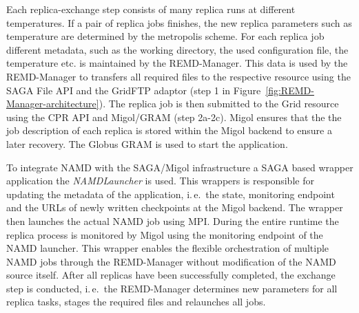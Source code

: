 \documentclass[times, 10pt, twocolumn]{article}
\begin{document}
Each replica-exchange step consists of many replica runs  at 
different temperatures. 
If a pair of replica jobs finishes, the new replica parameters 
such as temperature are determined by
the metropolis scheme.
For each replica job different metadata, such as the
working directory, the used configuration file, the temperature
etc. is maintained by the REMD-Manager.  This data is used by the REMD-Manager to
transfers all required files to the respective resource using the SAGA
File API and the GridFTP adaptor (step 1 in Figure~\ref{fig:REMD-Manager-architecture}). 
The replica job is then submitted to the Grid resource using  
the CPR API and Migol/GRAM (step 2a-2c). Migol ensures that the 
the job description of each replica is stored within the Migol backend to
ensure a later recovery.  The Globus GRAM is used to start the application.

To integrate NAMD with the SAGA/Migol infrastructure a SAGA based
wrapper application the \emph{NAMDLauncher} is used.  This wrappers is responsible for
updating the metadata of the application, i.\,e.\ the state,
monitoring endpoint and the URLs of newly written checkpoints at the
Migol backend.  The wrapper then launches the actual NAMD job using
MPI. During the entire runtime the replica process is monitored by 
Migol using the monitoring endpoint of the NAMD
launcher. This wrapper enables the flexible orchestration of multiple
NAMD jobs through the REMD-Manager without modification of the NAMD
source itself. After all replicas have been successfully completed,
the exchange step is conducted, i.\,e.\ the REMD-Manager determines
new parameters for all replica tasks, stages the required files and
relaunches all jobs.

                                             
\end{document}
